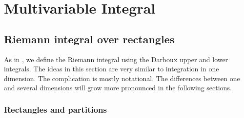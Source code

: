\chapter{Multivariable Integral} \label{mi:chapter}



\section{Riemann integral over rectangles}
\label{sec:rirect}



As in , we define the Riemann integral using the Darboux
upper and lower integrals.  The ideas in this section are very similar to
integration in one dimension.  The complication is mostly notational.
The differences between one and several dimensions will grow more pronounced
in the following sections.

\subsection{Rectangles and partitions}

